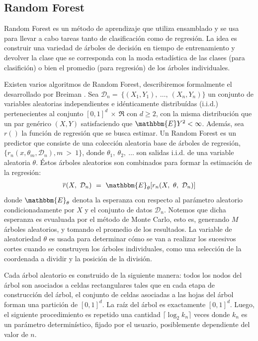 \subsection{Random Forest}

Random Forest es un método de aprendizaje que utiliza ensamblado y se
usa para llevar a cabo tareas tanto de clasificación como de regresión.
La idea es construir una variedad de árboles de decisión en tiempo de entrenamiento
y devolver la clase que se corresponda con la moda estadística de las clases
(para clasifición) o bien el promedio (para regresión) de los árboles individuales.

Existen varios algoritmos de Random Forest, describiremos formalmente el desarrollado
por Breiman \cite{random_forest}. Sea $\mathcal{D}_{n} = \ \{ (X_{1}, Y_{1}), \ \dots, \ (X_{n}, Y_{n})\}$
un conjunto de variables aleatorias independientes e idénticamente distribuídas (i.i.d.)
pertenecientes al conjunto $[0,1]^{d} \ \times \ \Re $ con $d \geq 2$, con la misma distribución que
un par genérico $(X,Y)$ satisfaciendo que $\mathbbm{E}Y^{2} < \infty$. Además,
sea $r()$ la función de regresión que se busca estimar.
Un Random Forest es un predictor que consiste de una colección aleatoria base
de árboles de regresión, $\{ r_{n}(x, \theta_{m}, \mathcal{D}_{n}), m \ > \ 1 \}$, donde
$\theta_{1},\ \theta_{2},\ \dots$ son salidas i.i.d. de una variable aleatoria
$\theta$. Éstos árboles aleatorios son combinados para formar la estimación
de la regresión:
\begin{align}
  \overline{r}(X,\ \mathcal{D}_{n})\ =\ \mathbbm{E}_{\theta}[r_{n}(X,\ \theta,\ \mathcal{D}_{n})]
\end{align}
donde $\mathbbm{E}_{\theta}$ denota la esperanza con respecto al parámetro aleatorio
condicionadamente por $X$ y el conjunto de datos $\mathcal{D}_{n}$. Notemos que
dicha esperanza es evualuada por el método de Monte Carlo, esto es, generando
$M$ árboles aleatorios, y tomando el promedio de los resultados. La variable
de aleatoriedad $\theta$ es usada para determinar cómo se van a realizar los
sucesivos cortes cuando se construyen los árboles individuales, como una selección
de la coordenada a dividir y la posición de la división.

Cada árbol aleatorio es construido de la siguiente manera: todos los nodos
del árbol son asociados a celdas rectangulares tales que en cada etapa de
construcción del árbol, el conjunto de celdas asociadas a las hojas del árbol
forman una partición de $[0, 1]^{d}$. La raíz del árbol es exactamente $[0, 1]^{d}$.
Luego, el siguiente procedimiento es repetido una cantidad $\lceil \log_{2}k_{n} \rceil$ veces
donde $k_{n}$ es un parámetro determinístico, fijado por el usuario, posiblemente
dependiente del valor de $n$.

